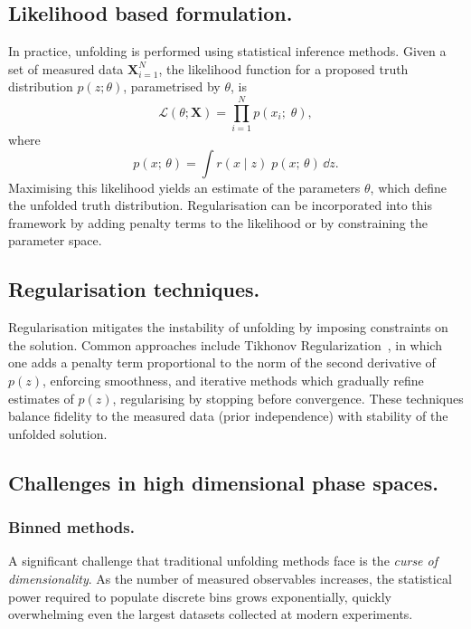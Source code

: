 \subsection{Likelihood based formulation.}
    In practice, unfolding is performed using statistical inference methods.
    Given a set of measured data \(\mathbf{X}_{i=1}^N\), the likelihood function for a proposed truth distribution \(p(z; \theta)\), parametrised by \(\theta\), is
    \begin{equation}
        \mathcal{L}(\theta; \mathbf{X}) = \prod_{i=1}^{N} p(x_i;\; \theta),
    \end{equation}
    where
    \begin{equation}
        p(x;\, \theta) = \int r(x\mid z) \;p(x;\,\theta) \, \dd z.
    \end{equation}
    Maximising this likelihood yields an estimate of the parameters \(\theta\), which define the unfolded truth distribution.
    Regularisation can be incorporated into this framework by adding penalty terms to the likelihood or by constraining the parameter space.

    \subsection{Regularisation techniques.}
        Regularisation mitigates the instability of unfolding by imposing constraints on the solution.
        Common approaches include Tikhonov Regularization~\cite{Karl2005RegularizationReconstruction}, in which one adds a penalty term proportional to the norm of the second derivative of \(p(z)\), enforcing smoothness, and iterative methods which gradually refine estimates of \(p(z)\), regularising by stopping before convergence.
        These techniques balance fidelity to the measured data (prior independence) with stability of the unfolded solution.

    \subsection{Challenges in high dimensional phase spaces.}
    \label{subsec:challenges-in-high-dimensional-phase-spaces}
        \subsubsection{Binned methods.}
        \label{subsubsec:binned-methods}
            A significant challenge that traditional unfolding methods face is the \emph{curse of dimensionality}.
            As the number of measured observables increases, the statistical power required to populate discrete bins grows exponentially, quickly overwhelming even the largest datasets collected at modern experiments.
    
